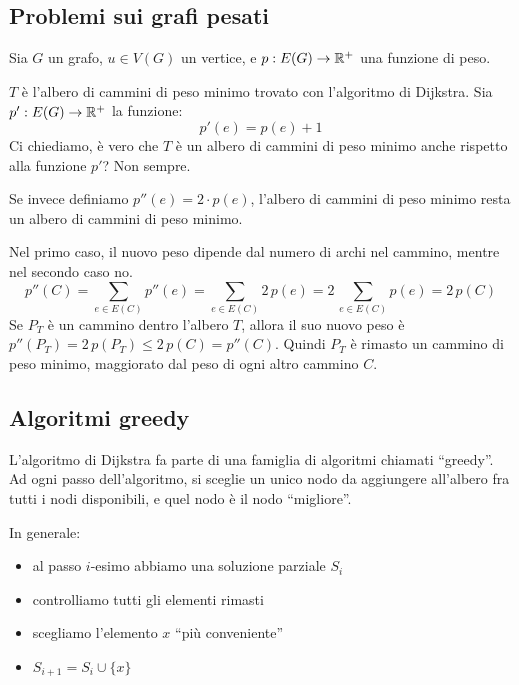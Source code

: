 \subsection{Problemi sui grafi pesati}

Sia $G$ un grafo, $u \in V(G)$ un vertice, e $p: E(G) \to \mathbb{R}^{+}$ una funzione di peso.

$T$ \`e l'albero di cammini di peso minimo trovato con l'algoritmo di Dijkstra. Sia $p' : E(G) \to \mathbb{R}^{+}$ la funzione:
\[
p'(e) = p(e) + 1
\]
Ci chiediamo, \`e vero che $T$ \`e un albero di cammini di peso minimo anche rispetto alla funzione $p'$? Non sempre.


Se invece definiamo $p''(e) = 2 \cdot p(e)$, l'albero di cammini di peso minimo resta un albero di cammini di peso minimo.

Nel primo caso, il nuovo peso dipende dal numero di archi nel cammino, mentre nel secondo caso no.
\[
p''(C) = \sum_{e \in E(C)} p''(e) = \sum_{e \in E(C)} 2 \, p(e) =
2 \, \sum_{e \in E(C)} p(e) = 2 \, p(C)
\]
Se $P_T$ \`e un cammino dentro l'albero $T$, allora il suo nuovo peso \`e $p''(P_T) = 2 \, p(P_T) \le 2 \, p(C) = p''(C)$. Quindi $P_T$ \`e rimasto un cammino di peso minimo, maggiorato dal peso di ogni altro cammino $C$.

\subsection{Algoritmi greedy}

L'algoritmo di Dijkstra fa parte di una famiglia di algoritmi chiamati ``greedy''. Ad ogni passo dell'algoritmo, si sceglie un unico nodo da aggiungere all'albero fra tutti i nodi disponibili, e quel nodo \`e il nodo ``migliore''.

In generale:
\begin{itemize}
    \item al passo $i$-esimo abbiamo una soluzione parziale $S_i$
    \item controlliamo tutti gli elementi rimasti
    \item scegliamo l'elemento $x$ ``pi\`u conveniente''
    \item $S_{i+1} = S_i \cup \{ x \}$
\end{itemize}

